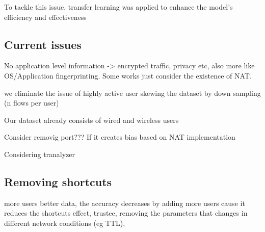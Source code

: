 To tackle this issue, transfer learning was applied to enhance the model's efficiency and effectiveness


\subsection{Current issues}
No application level information -> encrypted traffic, privacy etc, also more like OS/Application fingerprinting. Some works just consider the existence of NAT. 


we eliminate the issue of highly active user skewing the dataset by down sampling (n flows per user)

Our dataset already consists of wired and wireless users 

Consider removig port??? If it creates bias based on NAT implementation

Considering tranalyzer 





\subsection{Removing shortcuts}
more users better data, the accuracy decreases by adding more users cause it reduces the shortcuts effect, trustee, removing the parameters that changes in different network conditions (eg TTL), 


